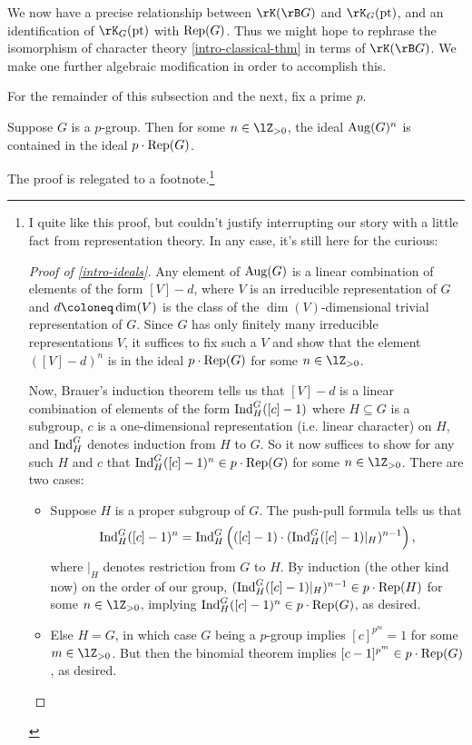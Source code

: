 We now have a precise relationship between $\rK(\rB G)$ and
$\rK_G(\pt)$, and an identification of $\rK_G(\pt)$ with
$\operatorname{Rep}(G)$. Thus we might hope to rephrase the isomorphism of character
theory \cref{intro-classical-thm} in terms of $\rK(\rB G)$. We make
one further algebraic modification in order to accomplish this.

\begin{notation}
  \label{intro-fixp}
  For the remainder of this subsection and the next, fix a prime $p$.
\end{notation}

\begin{lemma}
  \label{intro-ideals}
  Suppose $G$ is a $p$-group. Then for some $n \in \lZ_{> 0}$, the
  ideal $\operatorname{Aug}(G)^n$ is contained in the ideal $p \cdot \operatorname{Rep}(G)$.
\end{lemma}

The proof is relegated to a footnote.\footnote{ I quite like this
  proof, but couldn't justify interrupting our story with a little
  fact from representation theory. In any case, it's still here for
  the curious:

  \begin{proof}[Proof of \cref{intro-ideals}]
    Any element of $\operatorname{Aug}(G)$ is a linear combination of elements of
    the form $[V] - d$, where $V$ is an irreducible representation of
    $G$ and $d \ce \dim(V)$ is the class of the $\dim(V)$-dimensional
    trivial representation of $G$. Since $G$ has only finitely many
    irreducible representations $V$, it suffices to fix such a $V$ and
    show that the element $([V] - d)^n$ is in the ideal
    $p \cdot \operatorname{Rep}(G)$ for some $n \in \lZ_{> 0}$.

    Now, Brauer's induction theorem tells us that $[V]-d$ is a linear
    combination of elements of the form $\operatorname{Ind}_H^G([c]-1)$ where
    $H \subseteq G$ is a subgroup, $c$ is a one-dimensional
    representation (i.e. linear character) on $H$, and $\operatorname{Ind}_H^G$
    denotes induction from $H$ to $G$. So it now suffices to show for
    any such $H$ and $c$ that $\operatorname{Ind}_H^G([c]-1)^n \in p \cdot \operatorname{Rep}(G)$
    for some $n \in \lZ_{> 0}$. There are two cases:
    \begin{itemize}
    \item Suppose $H$ is a proper subgroup of $G$. The push-pull
      formula tells us that
      \[
      \operatorname{Ind}_H^G([c]-1)^n = \operatorname{Ind}_H^G\left(([c]-1) \cdot
      (\operatorname{Ind}_H^G([c]-1)|_H)^{n-1}\right),
      \]
      where $|_H$ denotes restriction from $G$ to $H$. By induction
      (the other kind now) on the order of our group,
      $(\operatorname{Ind}_H^G([c]-1)|_H)^{n-1} \in p \cdot \operatorname{Rep}(H)$ for some
      $n \in \lZ_{> 0}$, implying
      $\operatorname{Ind}_H^G([c]-1)^n \in p \cdot \operatorname{Rep}(G)$, as desired.
    \item Else $H = G$, in which case $G$ being a $p$-group implies
      $[c]^{p^m} = 1$ for some $m \in \lZ_{> 0}$. But then the
      binomial theorem implies $[c-1]^{p^m} \in p \cdot \operatorname{Rep}(G)$, as
      desired. \qedhere
    \end{itemize}
  \end{proof}
}

